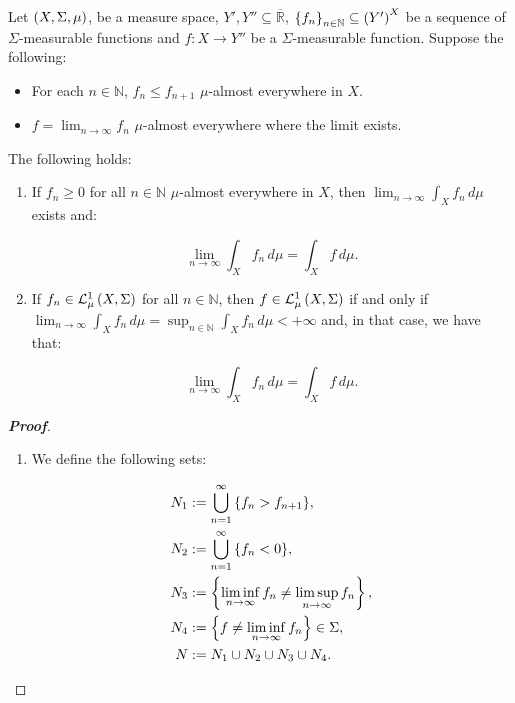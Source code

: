 \begin{theorem}\label{Monotone Convergence Theorem}
  Let $\left(X,\Sigma,\mu\right)$, be a measure space,  $Y',Y''\subseteq\overline{\mathbb{R}}$, $\left\{f_n\right\}_{n\in\mathbb{N}}\subseteq\left(Y'\right)^X$ be a sequence of $\Sigma$-measurable functions and $f:X\rightarrow Y''$ be a $\Sigma$-measurable function. Suppose the following:
  
  \begin{itemize}
    \item For each $n\in\mathbb{N}$, $f_n\leq f_{n+1}$ $\mu$-almost everywhere in $X$.
    \item $f=\lim_{n\to\infty}{f_n}$ $\mu$-almost everywhere where the limit exists.
  \end{itemize}
  
  The following holds:

  \begin{enumerate}
    \item If $f_n\geq 0$ for all $n\in\mathbb{N}$ $\mu$-almost everywhere in $X$, then $\lim_{n\to\infty}{\int_{X}{f_n\,d\mu}}$ exists and:
    
    \begin{equation}
      \lim_{n\to\infty}{\int_{X}{f_n\,d\mu}}=\int_{X}{f\,d\mu}.
    \end{equation}
    \item If $f_n\in\mathcal{L}^1_{\mu}\left(X,\Sigma\right)$ for all $n\in\mathbb{N}$, then $f\in\mathcal{L}^1_{\mu}\left(X,\Sigma\right)$ if and only if $\lim_{n\to\infty}{\int_{X}{f_n\,d\mu}}=\sup_{n\in\mathbb{N}}{\int_{X}{f_n\,d\mu}}<+\infty$ and, in that case, we have that:
    
    \begin{equation}
      \lim_{n\to\infty}{\int_{X}{f_n\,d\mu}}=\int_{X}{f\,d\mu}.
    \end{equation}
  \end{enumerate}

  \begin{proof}[\rm\textbf{Proof}]
    \hfill
    \begin{enumerate}
      \item We define the following sets:
      
      \begin{equation}
        \begin{split}
          N_1 & :=\bigcup_{n=1}^{\infty}{\left\{f_n>f_{n+1}\right\}},\\
          N_2 & :=\bigcup_{n=1}^{\infty}{\left\{f_n<0\right\}},\\
          N_3 & :=\left\{\liminf_{n\to\infty}{f_n}\neq\limsup_{n\to\infty}{f_n}\right\},\\
          N_4 & :=\left\{f\neq\liminf_{n\to\infty}{f_n}\right\}\in\Sigma,\\
          N & :=N_1\cup N_2\cup N_3\cup N_4.
        \end{split}
      \end{equation}
      

\end{enumerate}
\end{proof}
\end{theorem}
